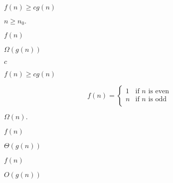 \documentclass[10pt]{book}
\begin{document}
\begin{mdSnippets}
\begin{mdInlineSnippet}%
$f(n) \ge cg(n)$\end{mdInlineSnippet}%
\begin{mdInlineSnippet}[c2a4a621e241337d5c179d54d3437bcd]%
$n \ge n_0.$\end{mdInlineSnippet}%
\begin{mdInlineSnippet}[a8988ce0f88f5292aa28b6e49f114d45]%
$f(n)$\end{mdInlineSnippet}%
\begin{mdInlineSnippet}%
$\Omega(g(n))$\end{mdInlineSnippet}%
\begin{mdInlineSnippet}[4a8a08f09d37b73795649038408b5f33]%
$c$\end{mdInlineSnippet}%
\begin{mdInlineSnippet}%
$f(n) \ge cg(n)$\end{mdInlineSnippet}%
\begin{mdDisplaySnippet}[7ff2bb9677290c5766e2f73746b0d8a3]%
\[%
f(n) = \begin{cases}
1 &\text{if $n$ is even} \\
n &\text{if $n$ is odd} \\
\end{cases}
\]%
\end{mdDisplaySnippet}%
\begin{mdInlineSnippet}[7d3c98c4ce755944c7c8b9e0bd9c0c48]%
$\Omega(n).$\end{mdInlineSnippet}%
\begin{mdInlineSnippet}[a8988ce0f88f5292aa28b6e49f114d45]%
$f(n)$\end{mdInlineSnippet}%
\begin{mdInlineSnippet}%
$\Theta(g(n))$\end{mdInlineSnippet}%
\begin{mdInlineSnippet}[a8988ce0f88f5292aa28b6e49f114d45]%
$f(n)$\end{mdInlineSnippet}%
\begin{mdInlineSnippet}%
$O(g(n))$\end{mdInlineSnippet}%

\end{mdSnippets}
\end{document}
